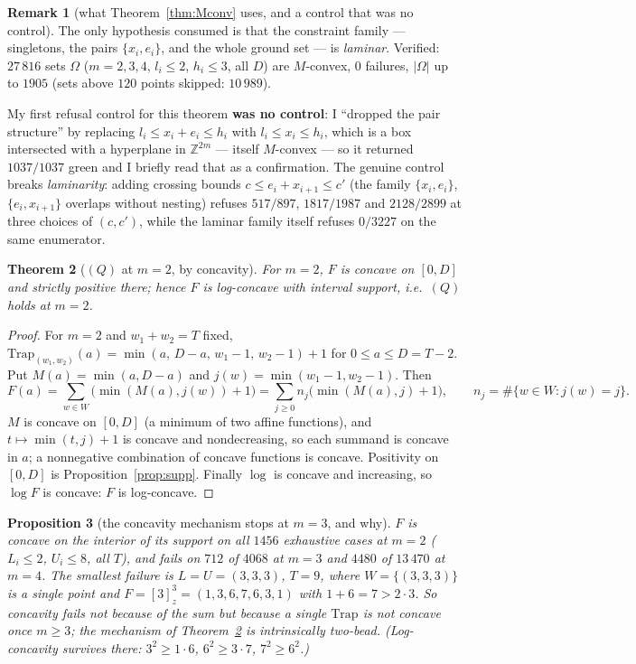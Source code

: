 \documentclass[11pt]{article}
\theoremstyle{plain}
\newtheorem{theorem}{Theorem}
\newtheorem{proposition}[theorem]{Proposition}
\theoremstyle{definition}
\newtheorem{remark}[theorem]{Remark}
\newcommand{\Trap}{\mathrm{Trap}}
\newcommand{\Z}{\mathbb{Z}}
\begin{document}
\begin{remark}[what Theorem~\ref{thm:Mconv} uses, and a control that was no control]
The only hypothesis consumed is that the constraint family --- singletons, the pairs
$\{x_i,e_i\}$, and the whole ground set --- is \emph{laminar}. Verified: $27\,816$
sets $\Omega$ ($m=2,3,4$, $l_i\le2$, $h_i\le3$, all $D$) are $M$-convex, $0$ failures,
$|\Omega|$ up to $1905$ (sets above $120$ points skipped: $10\,989$).

My first refusal control for this theorem \textbf{was no control}: I ``dropped the pair
structure'' by replacing $l_i\le x_i+e_i\le h_i$ with $l_i\le x_i\le h_i$, which is a box
intersected with a hyperplane in $\Z^{2m}$ --- itself $M$-convex --- so it returned
$1037/1037$ green and I briefly read that as a confirmation. The genuine control breaks
\emph{laminarity}: adding crossing bounds $c\le e_i+x_{i+1}\le c'$ (the family
$\{x_i,e_i\}$, $\{e_i,x_{i+1}\}$ overlaps without nesting) refuses $517/897$, $1817/1987$
and $2128/2899$ at three choices of $(c,c')$, while the laminar family itself refuses
$0/3227$ on the same enumerator.
\end{remark}

\begin{theorem}[$(Q)$ at $m=2$, by concavity]\label{thm:m2}
For $m=2$, $F$ is \emph{concave} on $[0,D]$ and strictly positive there; hence $F$ is
log-concave with interval support, i.e.\ $(Q)$ holds at $m=2$.
\end{theorem}
\begin{proof}
For $m=2$ and $w_1+w_2=T$ fixed,
$\Trap_{(w_1,w_2)}(a)=\min(a,\,D-a,\,w_1-1,\,w_2-1)+1$ for $0\le a\le D=T-2$. Put
$M(a)=\min(a,D-a)$ and $j(w)=\min(w_1-1,w_2-1)$. Then
\[
  F(a)=\sum_{w\in W}\bigl(\min(M(a),j(w))+1\bigr)=\sum_{j\ge0}n_j\bigl(\min(M(a),j)+1\bigr),
  \qquad n_j=\#\{w\in W:j(w)=j\}.
\]
$M$ is concave on $[0,D]$ (a minimum of two affine functions), and $t\mapsto\min(t,j)+1$
is concave and nondecreasing, so each summand is concave in $a$; a nonnegative
combination of concave functions is concave. Positivity on $[0,D]$ is
Proposition~\ref{prop:supp}. Finally $\log$ is concave and increasing, so $\log F$ is
concave: $F$ is log-concave.
\end{proof}

\begin{proposition}[the concavity mechanism stops at $m=3$, and why]\label{prop:m3}
$F$ is concave on the interior of its support on all $1456$ exhaustive cases at $m=2$
($L_i\le2$, $U_i\le8$, all $T$), and fails on $712$ of $4068$ at $m=3$ and $4480$ of
$13\,470$ at $m=4$. The smallest failure is $L=U=(3,3,3)$, $T=9$, where $W=\{(3,3,3)\}$ is
a \emph{single} point and $F=[3]_z^3=(1,3,6,7,6,3,1)$ with $1+6=7>2\cdot3$. So concavity
fails not because of the sum but because a \emph{single} $\Trap$ is not concave once
$m\ge3$; the mechanism of Theorem~\ref{thm:m2} is intrinsically two-bead.
(Log-concavity survives there: $3^2\ge1\cdot6$, $6^2\ge3\cdot7$, $7^2\ge6^2$.)
\end{proposition}
\end{document}
